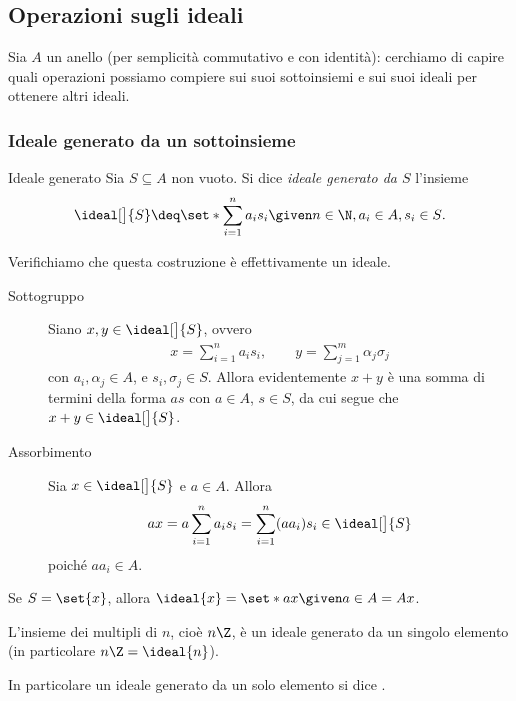 \subsection{Operazioni sugli ideali}

Sia $A$ un anello (per semplicità commutativo e con identità): cerchiamo di capire quali operazioni possiamo compiere sui suoi sottoinsiemi e sui suoi ideali per ottenere altri ideali.

\subsubsection{Ideale generato da un sottoinsieme}

\begin{definition}{Ideale generato}{}
    Sia $S \subseteq A$ non vuoto. Si dice \emph{ideale generato da $S$} l'insieme \[
        \ideal[\big]{S} \deq \set*{\sum_{i=1}^n a_is_i \given n \in \N, a_i \in A, s_i \in S}.
    \]
\end{definition}

Verifichiamo che questa costruzione è effettivamente un ideale.
\begin{description}
    \item[Sottogruppo] Siano $x, y \in \ideal[\big]{S}$, ovvero \begin{align*}
        x = \sum_{i=1}^n a_is_i, \qquad y = \sum_{j=1}^m \alpha_j\sigma_j
    \end{align*} con $a_i, \alpha_j \in A$, e $s_i, \sigma_j \in S$.
    Allora evidentemente $x + y$ è una somma di termini della forma $as$ con $a \in A$, $s \in S$, da cui segue che $x + y \in \ideal[\big]{S}$.
    \item[Assorbimento] Sia $x \in \ideal[\big]{S}$ e $a \in A$. Allora \[
        ax = a\sum_{i=1}^n a_is_i =  \sum_{i=1}^n (aa_i)s_i \in \ideal[\big]{S}
    \] poiché $aa_i \in A$.
\end{description}

\begin{example}
    Se $S = \set{x}$, allora $\ideal{x} = \set*{ax \given a \in A} = Ax$.
\end{example}
\begin{example}
    L'insieme dei multipli di $n$, cioè $n\Z$, è un ideale generato da un singolo elemento (in particolare $n\Z = \ideal{n}$).
\end{example}

In particolare un ideale generato da un solo elemento si dice .

